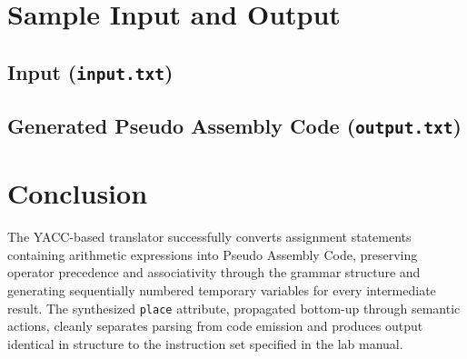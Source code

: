 \documentclass{article}
\begin{document}
\section{Sample Input and Output}

\subsection{Input (\texttt{input.txt})}


\subsection{Generated Pseudo Assembly Code (\texttt{output.txt})}


\section{Conclusion}
The YACC-based translator successfully converts assignment statements containing arithmetic expressions into Pseudo Assembly Code, preserving operator precedence and associativity through the grammar structure and generating sequentially numbered temporary variables for every intermediate result. The synthesized \texttt{place} attribute, propagated bottom-up through semantic actions, cleanly separates parsing from code emission and produces output identical in structure to the instruction set specified in the lab manual.
\end{document}
